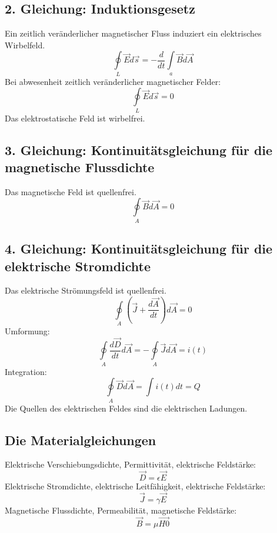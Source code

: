 \documentclass[12pt,a4paper]{article}
\begin{document}
\subsection{2. Gleichung: Induktionsgesetz}
Ein zeitlich veränderlicher magnetischer Fluss induziert ein elektrisches Wirbelfeld.
\[\oint\limits_L{\vec{E}d\vec{s}} = -\frac{d}{dt} \int\limits_a{\vec{B} d\vec{A}}\]
Bei abwesenheit zeitlich veränderlicher magnetischer Felder:
\[\oint\limits_L{\vec{E}d\vec{s}} = 0\]
Das elektrostatische Feld ist wirbelfrei.

\subsection{3. Gleichung: Kontinuitätsgleichung für die magnetische Flussdichte}
Das magnetische Feld ist quellenfrei.
\[\oint\limits_A{\vec{B} d\vec{A}} = 0\]

\subsection{4. Gleichung: Kontinuitätsgleichung für die elektrische Stromdichte}
Das elektrische Strömungsfeld ist quellenfrei.
\[\oint\limits_A{(\vec{J} + \frac{d\vec{A}}{dt})d\vec{A}} = 0\]
Umformung:
\[\oint\limits_A{\frac{d\vec{D}}{dt}d\vec{A}} = -\oint\limits_A{\vec{J}d\vec{A}} = i(t)\]
Integration:
\[\oint\limits_A{\vec{D}d\vec{A}} = \int{i(t)dt} = Q\]
Die Quellen des elektrischen Feldes sind die elektrischen Ladungen.

\subsection{Die Materialgleichungen}
Elektrische Verschiebungsdichte, Permittivität, elektrische Feldstärke:
\[\vec{D} = \epsilon \vec{E}\]
Elektrische Stromdichte, elektrische Leitfähigkeit, elektrische Feldstärke:
\[\vec{J} = \gamma \vec{E}\]
Magnetische Flussdichte, Permeabilität, magnetische Feldstärke:
\[\vec{B} = \mu \vec{H0}\]
\end{document}
